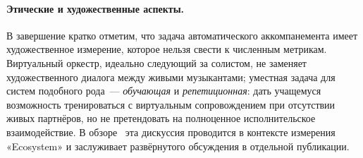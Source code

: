 \paragraph*{Этические и художественные аспекты.} В завершение
кратко отметим, что задача автоматического аккомпанемента
имеет художественное измерение, которое нельзя свести к
численным метрикам. Виртуальный оркестр, идеально следующий за
солистом, не заменяет художественного диалога между
живыми музыкантами; уместная задача для систем подобного
рода~--- \textit{обучающая} и \textit{репетиционная}: дать
учащемуся возможность тренироваться с виртуальным
сопровождением при отсутствии живых партнёров, но не
претендовать на полноценное исполнительское взаимодействие. В
обзоре~\cite{Kim2026LiveAgents} эта дискуссия проводится в
контексте измерения «Ecosystem» и заслуживает развёрнутого
обсуждения в отдельной публикации.
